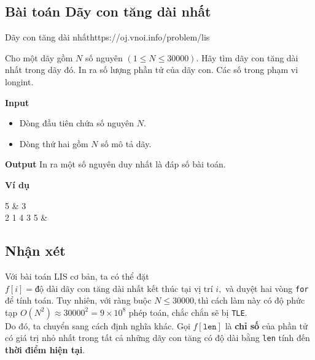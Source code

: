 \subsection{Bài toán Dãy con tăng dài nhất}

\begin{baitap}{Dãy con tăng dài nhất}{https://oj.vnoi.info/problem/lis}

Cho một dãy gồm $N$ số nguyên $(1 \leq N \leq 30000)$. Hãy tìm dãy con tăng dài nhất trong dãy đó. In ra số lượng phần tử của dãy con. Các số trong phạm vi longint.

\textbf{Input}  
\begin{itemize}[noitemsep]
  \item Dòng đầu tiên chứa số nguyên $N$.
  \item Dòng thứ hai gồm $N$ số mô tả dãy.
\end{itemize}

\textbf{Output}  
In ra một số nguyên duy nhất là đáp số bài toán.

\textbf{Ví dụ}  

\begin{sampleio}
5 & 3 \\
2 1 4 3 5 & \\
\end{sampleio}

\end{baitap}

\subsection{Nhận xét}

Với bài toán LIS cơ bản, ta có thể đặt 
$f[i] = \text{độ dài dãy con tăng dài nhất kết thúc tại vị trí } i,$
và duyệt hai vòng \texttt{for} để tính toán. Tuy nhiên, với ràng buộc $N \leq 30000,$thì cách làm này có độ phức tạp $O(N^2) \approx 30000^2 = 9 \times 10^8$ phép toán, chắc chắn sẽ bị \texttt{TLE}. \\

Do đó, ta chuyển sang cách định nghĩa khác. Gọi $f[\texttt{len}]$ là \textbf{chỉ số} của phần tử có giá trị nhỏ nhất trong tất cả những dãy con tăng có độ dài bằng \texttt{len} tính đến \textbf{thời điểm hiện tại}.